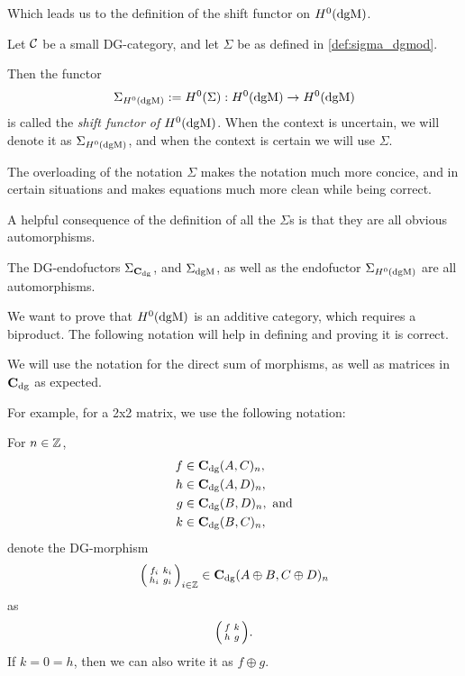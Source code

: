 Which leads us to the definition of the shift functor on \( H^0(\operatorname{dgM}) \).

\begin{definition}
    \label{def:sigma_h_0_dgmod}
    Let \( {\mathcal{C}} \) be a small DG-category, and let \( \Sigma \) be as defined in \autoref{def:sigma_dgmod}.

    Then the functor
    \[
        \Sigma_{H^0(\operatorname{dgM})} := H^0(\Sigma): H^0(\operatorname{dgM}) \to H^0(\operatorname{dgM})
    \]
    is called the \emph{shift functor of \( H^0(\operatorname{dgM}) \)}. When the context is uncertain, we will denote it as \( \Sigma_{H^0(\operatorname{dgM})} \), and when the context is certain we will use \( \Sigma \).
\end{definition}

The overloading of the notation \( \Sigma \) makes the notation much more concice, and in certain situations and makes equations much more clean while being correct.

A helpful consequence of the definition of all the \( \Sigma \)s is that they are all obvious automorphisms.
\begin{remark}
    \label{rem:dgm_sigma_automorphism}
    The DG-endofuctors \( \Sigma_{\operatorname{\mathbf{C}}_{\operatorname{dg}}} \), and \( \Sigma_{\operatorname{dgM}} \), as well as the endofuctor \( \Sigma_{H^0(\operatorname{dgM})} \) are all automorphisms.
\end{remark}

We want to prove that \( H^0(\operatorname{dgM}) \) is an additive category, which requires a biproduct. The following notation will help in defining and proving it is correct.

\begin{notation}
    \label{not:c_dg_matrix_direct_sum}
    We will use the notation for the direct sum of morphisms, as well as matrices in \( \operatorname{\mathbf{C}}_{\operatorname{dg}} \) as expected.

    For example, for a 2x2 matrix, we use the following notation:

    For \( n \in {\mathbb{Z}} \),
    \begin{align*}
        f &\in \operatorname{\mathbf{C}}_{\operatorname{dg}}(A, C)_n, \\
        h &\in \operatorname{\mathbf{C}}_{\operatorname{dg}}(A, D)_n, \\
        g &\in \operatorname{\mathbf{C}}_{\operatorname{dg}}(B, D)_n, \text{ and} \\
        k &\in \operatorname{\mathbf{C}}_{\operatorname{dg}}(B, C)_n,
    \end{align*}
    denote the DG-morphism
    \[
        \begin{psmallmatrix}
            f_i & k_i \\
            h_i & g_i
        \end{psmallmatrix}_{i \in {\mathbb{Z}}}
        \in
        \operatorname{\mathbf{C}}_{\operatorname{dg}}(A \oplus B, C \oplus D)_n
    \]
    as
    \[
        \begin{psmallmatrix}
            f & k \\
            h & g
        \end{psmallmatrix}.
    \]
    If \( k = 0 = h \), then we can also write it as \( f \oplus g \).
\end{notation}

